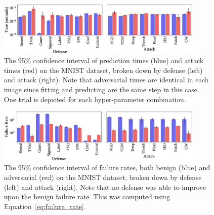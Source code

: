 \documentclass[journal]{IEEEtran}
\begin{document}
\begin{figure}[!hptb]
    {\centering
    \includegraphics[trim={0 0.85em 0 0.35em},clip,width=0.9\textwidth]{Fig19.eps}
    \vspace{-1em}
    \caption{The 95\% confidence interval of prediction times (blue) and attack times (red) on the MNIST dataset, broken down by defense (left) and attack (right). Note that adversarial times are identical in each image since fitting and predicting are the same step in this case. One trial is depicted for each hyper-parameter combination.}
    \label{fig:mnist_time}
    } %
\end{figure}

\begin{figure}[!hptb]
    {\centering
    \includegraphics[trim={0 0.85em 0 0.35em},clip,width=0.9\textwidth]{Fig20.eps}
    \vspace{-1em}
    \caption{The 95\% confidence interval of failure rates, both benign (blue) and adversarial (red) on the MNIST dataset, broken down by defense (left) and attack (right). Note that no defense was able to improve upon the benign failure rate. This was computed using Equation~\ref{eq:failure_rate}.}
    \label{fig:mnist_failure_rate}
    } %
\end{figure}
\end{document}
